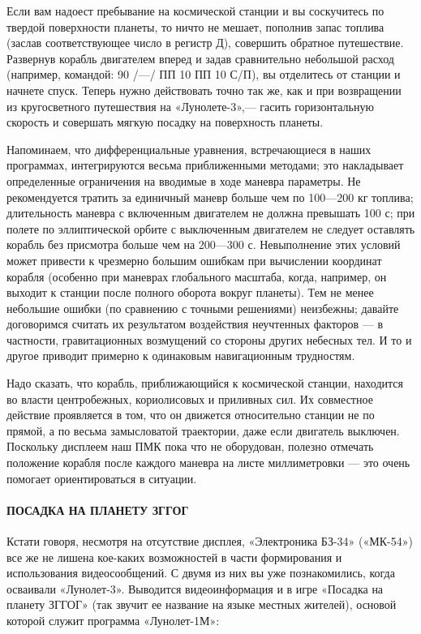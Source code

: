 \documentclass[11pt,a4paper,oneside]{article}
\begin{document}
Если вам надоест пребывание на космической станции и вы соскучитесь по твердой поверхности планеты, то ничто не мешает, пополнив запас топлива (заслав соответствующее число в регистр Д), совершить обратное путешествие. Развернув корабль двигателем вперед и задав сравнительно небольшой расход (например, командой: 90 /—/ ПП 10 ПП 10 С/П), вы отделитесь от станции и начнете спуск. Теперь нужно действовать точно так же, как и при возвращении из кругосветного путешествия на «Лунолете-3»,— гасить горизонтальную скорость и совершать мягкую посадку на поверхность планеты.

Напоминаем, что дифференциальные уравнения, встречающиеся в наших программах, интегрируются весьма приближенными методами; это накладывает определенные ограничения на вводимые в ходе маневра параметры. Не рекомендуется тратить за единичный маневр больше чем по 100—200 кг топлива; длительность маневра с включенным двигателем не должна превышать 100 с; при полете по эллиптической орбите с выключенным двигателем не следует оставлять корабль без присмотра больше чем на 200—300 с. Невыполнение этих условий может привести к чрезмерно большим ошибкам при вычислении координат корабля (особенно при маневрах глобального масштаба, когда, например, он выходит к станции после полного оборота вокруг планеты). Тем не менее небольшие ошибки (по сравнению с точными решениями) неизбежны; давайте договоримся считать их результатом воздействия неучтенных факторов — в частности, гравитационных возмущений со стороны других небесных тел. И то и другое приводит примерно к одинаковым навигационным трудностям.

Надо сказать, что корабль, приближающийся к космической станции, находится во власти центробежных, кориолисовых и приливных сил. Их совместное действие проявляется в том, что он движется относительно станции не по прямой, а по весьма замысловатой траектории, даже если двигатель выключен. Поскольку дисплеем наш ПМК пока что не оборудован, полезно отмечать положение корабля после каждого маневра на листе миллиметровки — это очень помогает ориентироваться в ситуации.

\paragraph{ПОСАДКА НА ПЛАНЕТУ ЗГГОГ}
Кстати говоря, несмотря на отсутствие дисплея, «Электроника БЗ-34» («МК-54») все же не лишена кое-каких возможностей в части формирования и использования видеосообщений. С двумя из них вы уже познакомились, когда осваивали «Лунолет-3». Выводится видеоинформация и в игре «Посадка на планету ЗГГОГ» (так звучит ее название на языке местных жителей), основой которой служит программа «Лунолет-1М»:
\end{document}

